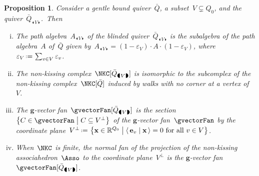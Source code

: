 \documentclass{amsart}
\newtheorem{proposition}[theorem]{Proposition}
\theoremstyle{definition}
\newcommand{\R}{\mathbb{R}} %
\renewcommand{\b}[1]{\mathbf{#1}} %
\newcommand{\set}[2]{\left\{ #1 \;\middle|\; #2 \right\}} %
\newcommand{\dotprod}[2]{\left\langle \, #1 \; \middle| \; #2 \, \right\rangle} %
\newcommand{\eqdef}{\mbox{\,\raisebox{0.2ex}{\scriptsize\ensuremath{\mathrm:}}\ensuremath{=}\,}} %
\newcommand{\blinkers}[1]{_{\LEFTCIRCLE \!\! #1 \!\! \RIGHTCIRCLE}} %
\begin{document}
\begin{proposition}
\label{prop:projection}
Consider a gentle bound quiver~$\bar Q$, a subset~$V \subsetneq Q_0$, and the quiver~$\bar Q\blinkers{V}$.~Then
\begin{enumerate}[(i)]
\item The path algebra~$A\blinkers{V}$ of the blinded quiver~$\bar Q\blinkers{V}$ is the subalgebra of the path algebra~$A$ of~$\bar Q$ given by~$A\blinkers{V} = (1-\varepsilon_V) \cdot A \cdot (1-\varepsilon_V)$, where~$\varepsilon_V \eqdef \sum_{v \in V} \varepsilon_v$.
\item The non-kissing complex~$\NKC[\bar Q\blinkers{V}]$ is isomorphic to the subcomplex of the non-kissing complex~$\NKC[\bar Q]$ induced by walks with no corner at a vertex of~$V$.
\item The $\b{g}$-vector fan~$\gvectorFan[\bar Q\blinkers{V}]$ is the section~$\set{C \in \gvectorFan}{C \subseteq V^\perp}$ of the $\b{g}$-vector fan~$\gvectorFan$ by the coordinate plane~$V^\perp \eqdef \set{\b{x} \in \R^{Q_0}}{\dotprod{\b{e}_v}{\b{x}} = 0 \text{ for all } v \in V}$.
\item When~$\NKC$ is finite, the normal fan of the projection of the non-kissing associahedron~$\Asso$ to the coordinate plane~$V^\perp$ is the $\b{g}$-vector fan~$\gvectorFan[\bar Q\blinkers{V}]$.
\end{enumerate}
\end{proposition}
\end{document}
